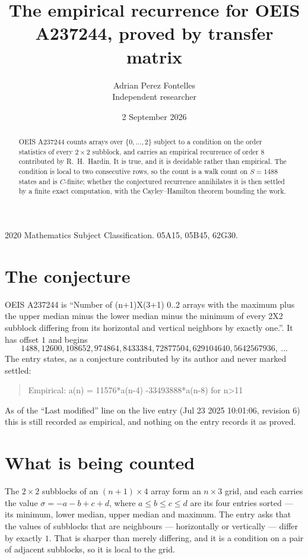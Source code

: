 \documentclass[11pt,a4paper]{article}
\title{The empirical recurrence for OEIS A237244, proved by transfer matrix}
\author{Adrian Perez Fontelles\\ \small Independent researcher}
\date{2 September 2026}
\theoremstyle{plain}
\theoremstyle{definition}
\begin{document}
\maketitle

\begin{abstract}
OEIS A237244 counts arrays over $\{0,\dots,2\}$ subject to a condition on the order
statistics of every $2\times2$ subblock, and carries an empirical recurrence of order
$8$ contributed by R.~H.~Hardin. It is true, and it is decidable rather than empirical.
The condition is local to two consecutive rows, so the count is a walk count on $S=1488$
states and is $C$-finite; whether the conjectured recurrence annihilates it is then settled by
a finite exact computation, with the Cayley--Hamilton theorem bounding the work.
\end{abstract}

\noindent\small 2020 Mathematics Subject Classification. 05A15, 05B45, 62G30.\normalsize

\section{The conjecture}

OEIS A237244 is ``Number of (n+1)X(3+1) 0..2 arrays with the maximum plus the upper median minus the lower median minus the minimum of every 2X2 subblock differing from its horizontal and vertical neighbors by exactly one.''. It has offset $1$ and begins
\[
1488, 12600, 108652, 974864, 8433384, 72877504, 629104640, 5642567936,\ \dots
\]
The entry states, as a conjecture contributed by its author and never marked settled:
\begin{quote}
Empirical: a(n) = 11576*a(n-4) -33493888*a(n-8) for n>11
\end{quote}
As of the ``Last modified'' line on the live entry (Jul 23 2025 10:01:06, revision 6) this is still
recorded as empirical, and nothing on the entry records it as proved.

\section{What is being counted}

The $2\times2$ subblocks of an $(n+1)\times4$ array form an
$n\times3$ grid, and each carries the value $\sigma=-a-b+c+d$, where $a\le b\le c\le d$ are its four entries sorted --- its minimum, lower median, upper median and maximum. The entry asks that the values of
subblocks that are neighbours --- horizontally or vertically --- differ by exactly $1$.
That is sharper than merely differing, and it is a condition on a pair of adjacent subblocks,
so it is local to the grid.
\end{document}
